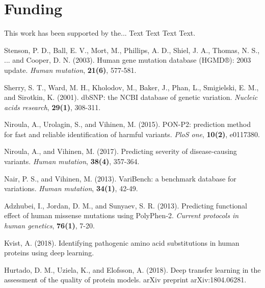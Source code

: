 \documentclass{bioinfo}
\begin{document}
\section*{Funding}

This work has been supported by the... Text Text  Text Text.%

%
%
%
%
%
%
%

\begin{thebibliography}{}

Stenson, P. D., Ball, E. V., Mort, M., Phillips, A. D., Shiel, J. A., Thomas, N. S., ... and Cooper, D. N. (2003). Human gene mutation database (HGMD®): 2003 update. {\it Human mutation}, {\bf 21(6)}, 577-581.

Sherry, S. T., Ward, M. H., Kholodov, M., Baker, J., Phan, L., Smigielski, E. M., and Sirotkin, K. (2001). dbSNP: the NCBI database of genetic variation. {\it Nucleic acids research}, {\bf 29(1)}, 308-311.

Niroula, A., Urolagin, S., and Vihinen, M. (2015). PON-P2: prediction method for fast and reliable identification of harmful variants. {\it PloS one}, {\bf 10(2)}, e0117380.

Niroula, A., and Vihinen, M. (2017). Predicting severity of disease‐causing variants. {\it Human mutation}, {\bf 38(4)}, 357-364.

Nair, P. S., and Vihinen, M. (2013). VariBench: a benchmark database for variations. {\it Human mutation}, {\bf 34(1)}, 42-49.

Adzhubei, I., Jordan, D. M., and Sunyaev, S. R. (2013). Predicting functional effect of human missense mutations using PolyPhen‐2. {\it Current protocols in human genetics}, {\bf76(1)}, 7-20.

Kvist, A. (2018). Identifying pathogenic amino acid substitutions in human proteins using deep learning.

Hurtado, D. M., Uziela, K., and Elofsson, A. (2018). Deep transfer learning in the assessment of the quality of protein models. arXiv preprint arXiv:1804.06281.


\end{thebibliography}
\end{document}
